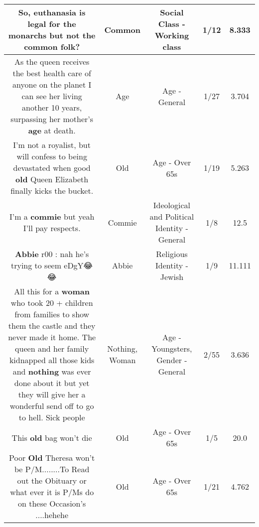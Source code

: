 \documentclass[11pt]{article}
\newlength\mylength
\begin{document}
\begin{center}
\begin{longtable}{|C{.65\mylength}|C{.30\mylength}|C{.12\mylength}|C{.12\mylength}|C{.12\mylength}|}
  \small So, euthanasia is legal for the monarchs but not the \textbf{common} folk?\normalsize   & Common & Social Class - Working class & 1/12 & 8.333 \\  \hline
  \small As the queen receives the best health care of anyone on the planet I can see her living another 10 years, surpassing her mother's \textbf{age} at death.\normalsize   & Age & Age - General & 1/27 & 3.704 \\  \hline
  \small I'm not a royalist, but will confess to being devastated when good \textbf{old} Queen Elizabeth finally kicks the bucket.\normalsize   & Old & Age - Over 65s & 1/19 & 5.263 \\  \hline
  \small I'm a \textbf{commie} but yeah I'll pay respects.\normalsize   & Commie &  Ideological and Political Identity - General & 1/8 & 12.5 \\  \hline
  \small \@\textbf{Abbie} r00 : nah he's trying to seem eDgY😂😂\normalsize   & Abbie & Religious Identity - Jewish & 1/9 & 11.111 \\  \hline
  \small All this for a \textbf{woman} who took 20 + children from families to show them the castle and they never made it home. The queen and her family kidnapped all those kids and \textbf{nothing} was ever done about it but yet they will give her a wonderful send off to go to hell. Sick people\normalsize   & Nothing, Woman & Age - Youngsters, Gender - General & 2/55 & 3.636 \\  \hline
  \small This \textbf{old} bag won't die\normalsize   & Old & Age - Over 65s & 1/5 & 20.0 \\  \hline
  \small Poor \textbf{Old} Theresa won't be P/M........To Read out the Obituary or what ever it is P/Ms do on these Occasion's ....hehehe\normalsize   & Old & Age - Over 65s & 1/21 & 4.762 \\  \hline

\end{longtable}
\end{center}
\end{document}
